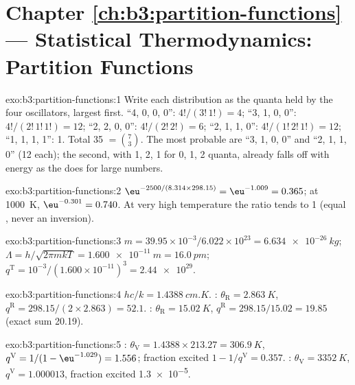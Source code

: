 \section*{Chapter \ref{ch:b3:partition-functions} --- Statistical Thermodynamics: Partition Functions}

\begin{solution}{exo:b3:partition-functions:1}
Write each distribution as the quanta held by the four oscillators, largest
first. ``4, 0, 0, 0'': $4!/(3!\,1!) = 4$; ``3, 1, 0, 0'': $4!/(2!\,1!\,1!) = 12$; ``2, 2, 0, 0'':
$4!/(2!\,2!) = 6$; ``2, 1, 1, 0'': $4!/(1!\,2!\,1!) = 12$; ``1, 1, 1, 1'': 1. Total 35 $= \binom73$.
The most probable are ``3, 1, 0, 0'' and ``2, 1, 1, 0'' (12 each); the second, with
 1, 2, 1 for 0, 1, 2 quanta, already falls off with energy as the
 does for large numbers.
\end{solution}

\begin{solution}{exo:b3:partition-functions:2}
$\eu^{-2500/(8.314 \times 298.15)} = \eu^{-1.009} = 0.365$; at \qty{1000}{K}, $\eu^{-0.301} = 0.740$. At very high
temperature the ratio tends to 1 (equal , never an inversion).
\end{solution}

\begin{solution}{exo:b3:partition-functions:3}
$m = 39.95\times10^{-3}/6.022\times10^{23} = \qty{6.634e-26}{kg}$; $\Lambda = h/\sqrt{2\pi mkT} =
\qty{1.600e-11}{m} = \qty{16.0}{pm}$; $q^{\mathrm T} = 10^{-3}/(1.600\times10^{-11})^3 = \num{2.44e29}$.
\end{solution}

\begin{solution}{exo:b3:partition-functions:4}
$hc/k = \qty{1.4388}{cm.K}$. : $\theta_{\mathrm R} = \qty{2.863}{K}$, $q^{\mathrm R} = 298.15/(2 \times 2.863) = 52.1$.
: $\theta_{\mathrm R} = \qty{15.02}{K}$, $q^{\mathrm R} = 298.15/15.02 = 19.85$ (exact sum 20.19).
\end{solution}

\begin{solution}{exo:b3:partition-functions:5}
: $\theta_{\mathrm V} = 1.4388 \times 213.27 = \qty{306.9}{K}$, $q^{\mathrm V} = 1/(1 - \eu^{-1.029}) = 1.556$;
fraction excited $1 - 1/q^{\mathrm V} = 0.357$. : $\theta_{\mathrm V} = \qty{3352}{K}$, $q^{\mathrm V} = 1.000013$,
fraction excited \num{1.3e-5}.
\end{solution}


